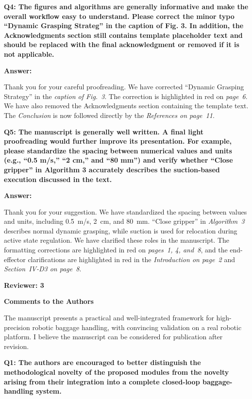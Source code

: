 \documentclass[journal,10pt]{IEEEtran}
\newcommand{\reviewer}[1]{%
  \par\smallskip\noindent
  \textcolor{responseblue}{\textbf{#1\hspace{0.2em}}}\par\nobreak%
}
\newcommand{\question}[2]{%
  \par\smallskip\noindent
  {\color{responseblue}\bfseries\clubpenalty=10000\widowpenalty=10000 Q#1: #2\par}%
  \par\nobreak\noindent
}
\newcommand{\answer}{%
  \par\smallskip\noindent
  \textbf{Answer: }\ignorespaces
}
\newcommand{\reviewercomments}{%
  \par\smallskip\noindent
  {\color{responseblue}\bfseries Comments to the Authors\par\nobreak}%
  \noindent\ignorespaces
}
\begin{document}
\question{4}{The figures and algorithms are generally informative and make the overall workflow easy to understand. Please correct the minor typo “Dynamic Grasping Strateg” in the caption of Fig. 3. In addition, the Acknowledgments section still contains template placeholder text and should be replaced with the final acknowledgment or removed if it is not applicable.}

\answer
Thank you for your careful proofreading. We have corrected ``Dynamic Grasping Strategy'' in the \textit{caption of Fig.~3}. The correction is highlighted in red on \textit{page~6}. We have also removed the Acknowledgments section containing the template text. The \textit{Conclusion} is now followed directly by the \textit{References on page~11}.

\question{5}{The manuscript is generally well written. A final light proofreading would further improve its presentation. For example, please standardize the spacing between numerical values and units (e.g., “0.5 m/s,” “2 cm,” and “80 mm”) and verify whether “Close gripper” in Algorithm 3 accurately describes the suction-based execution discussed in the text.}

\answer
Thank you for your suggestion. We have standardized the spacing between values and units, including 0.5~m/s, 2~cm, and 80~mm. ``Close gripper'' in \textit{Algorithm~3} describes normal dynamic grasping, while suction is used for relocation during active state regulation. We have clarified these roles in the manuscript. The formatting corrections are highlighted in red on \textit{pages~1, 4, and~8}, and the end-effector clarifications are highlighted in red in the \textit{Introduction on page~2} and \textit{Section~IV-D3 on page~8}.

\reviewer{Reviewer: 3}

\reviewercomments
The manuscript presents a practical and well-integrated framework for high-precision robotic baggage handling, with convincing validation on a real robotic platform. I believe the manuscript can be considered for publication after revision.

\question{1}{The authors are encouraged to better distinguish the methodological novelty of the proposed modules from the novelty arising from their integration into a complete closed-loop baggage-handling system.}
\end{document}
